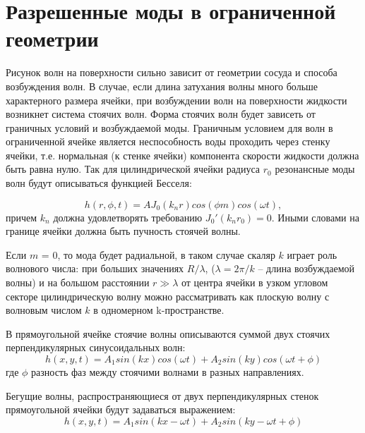 \section{Разрешенные моды в ограниченной геометрии} %
Рисунок волн на поверхности сильно зависит от геометрии сосуда и способа возбуждения волн.
В случае, если длина затухания волны много больше характерного размера ячейки, при возбуждении волн на поверхности жидкости возникнет система стоячих волн. Форма стоячих волн будет зависеть от граничных условий и возбуждаемой моды. Граничным условием для волн в ограниченной ячейке является неспособность воды проходить через стенку ячейки, т.е. нормальная (к стенке ячейки) компонента скорости жидкости должна быть равна нулю. Так для цилиндрической ячейки радиуса $r_0$ резонансные моды волн будут описываться функцией Бесселя:

\begin{equation}
 \label{eq:Bessel}
h(r, \phi, t) = A J_0(k_nr) cos(\phi m) cos(\omega t),
\end{equation}
причем $k_n$ должна удовлетворять требованию ${J_0}'(k_nr_0) = 0$. Иными словами на границе ячейки должна быть пучность стоячей волны.

Если $m$ = 0, то мода будет радиальной, в таком случае скаляр $k$ играет роль волнового числа: при больших значениях $R/\lambda$, ($\lambda = 2\pi/k$ – длина возбуждаемой волны) и на большом расстоянии $r \gg \lambda$ от центра ячейки в узком угловом секторе цилиндрическую волну можно рассматривать как плоскую волну с волновым числом $k$ в одномерном k-пространстве.

В прямоугольной ячейке стоячие волны описываются суммой двух стоячих перпендикулярных синусоидальных волн:
\begin{equation}
\label{eq:waveStand}
h(x, y, t) = A_1 sin(kx)cos(\omega t)+A_2 sin(ky)cos(\omega t+ \phi)
\end{equation}
где $\phi$ разность фаз между стоячими волнами в разных направлениях.

Бегущие волны, распространяющиеся от двух перпендикулярных стенок прямоугольной ячейки будут задаваться выражением:
\begin{equation}
\label{eq:waveRun}
h(x, y, t) = A_1 sin(kx-\omega t)+A_2 sin(ky-\omega t+ \phi)
\end{equation}




